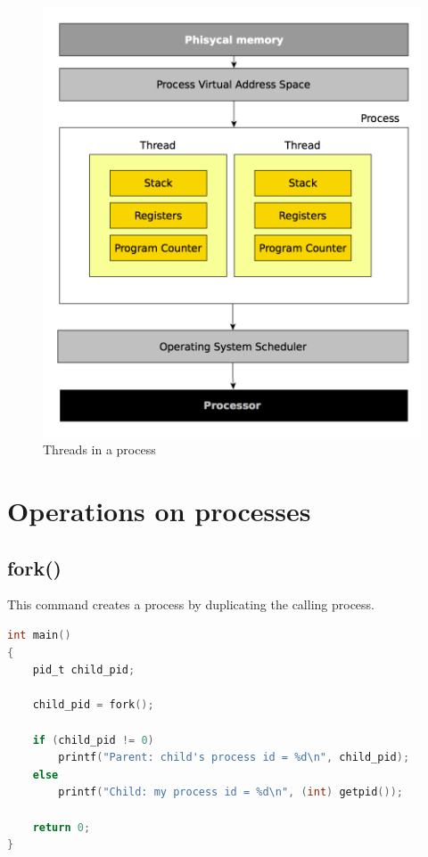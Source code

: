 \begin{figure}[]
	\centering
	\includegraphics[width=\textwidth]{gfx/process_threads}
	
	\caption{Threads in a process}
	\label{Fig:process_threads}
\end{figure}



\pagebreak

\section{Operations on processes}

\subsection{fork()}
This command creates a process by duplicating the calling process.
\begin{lstlisting}[language=C]
int main()
{
	pid_t child_pid; 

	child_pid = fork();

	if (child_pid != 0)
		printf("Parent: child's process id = %d\n", child_pid);
	else
		printf("Child: my process id = %d\n", (int) getpid()); 
		
	return 0;
}
\end{lstlisting}

